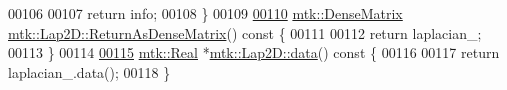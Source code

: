 \begin{DoxyCode}
00106 
00107   \textcolor{keywordflow}{return} info;
00108 \}
00109 
\hypertarget{mtk__lap__2d_8cc_source_l00110}{}\hyperlink{classmtk_1_1Lap2D_aaac0a22eaa2f036869b24fd420ce5761}{00110} \hyperlink{classmtk_1_1DenseMatrix}{mtk::DenseMatrix} \hyperlink{classmtk_1_1Lap2D_aaac0a22eaa2f036869b24fd420ce5761}{mtk::Lap2D::ReturnAsDenseMatrix}()\textcolor{keyword}{ const }\{
00111 
00112   \textcolor{keywordflow}{return} laplacian\_;
00113 \}
00114 
\hypertarget{mtk__lap__2d_8cc_source_l00115}{}\hyperlink{classmtk_1_1Lap2D_a102427355df09c2aad400c6ce18e5636}{00115} \hyperlink{group__c01-roots_gac080bbbf5cbb5502c9f00405f894857d}{mtk::Real} *\hyperlink{classmtk_1_1Lap2D_a102427355df09c2aad400c6ce18e5636}{mtk::Lap2D::data}()\textcolor{keyword}{ const }\{
00116 
00117   \textcolor{keywordflow}{return} laplacian\_.data();
00118 \}
\end{DoxyCode}

